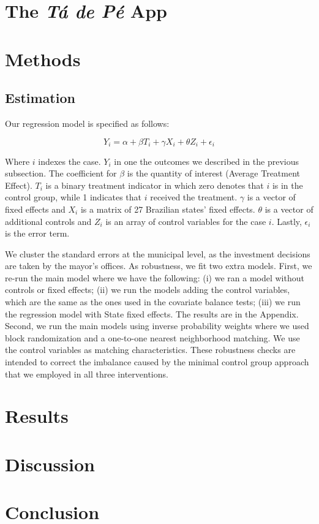 \documentclass[12pt,a4paper,]{article}
\begin{document}
\hypertarget{the-ta-de-pe-app}{%
\section{\texorpdfstring{The \emph{Tá de Pé}
App}{The Tá de Pé App}}\label{the-ta-de-pe-app}}

\hypertarget{methods}{%
\section{Methods}\label{methods}}

\hypertarget{estimation}{%
\subsection{Estimation}\label{estimation}}

Our regression model is specified as follows:

\[Y_{i} = \alpha + \beta T_{i} + \gamma X_{i} + \theta Z_i + \epsilon_{i} \]

Where \(i\) indexes the case. \(Y_i\) in one the outcomes we described
in the previous subsection. The coefficient for \(\beta\) is the
quantity of interest (Average Treatment Effect). \(T_i\) is a binary
treatment indicator in which zero denotes that \(i\) is in the control
group, while 1 indicates that \(i\) received the treatment. \(\gamma\)
is a vector of fixed effects and \(X_i\) is a matrix of 27 Brazilian
states' fixed effects. \(\theta\) is a vector of additional controls and
\(Z_i\) is an array of control variables for the case \(i\). Lastly,
\(\epsilon_i\) is the error term.

We cluster the standard errors at the municipal level, as the investment
decisions are taken by the mayor's offices. As robustness, we fit two
extra models. First, we re-run the main model where we have the
following: (i) we ran a model without controls or fixed effects; (ii) we
run the models adding the control variables, which are the same as the
ones used in the covariate balance tests; (iii) we run the regression
model with State fixed effects. The results are in the Appendix. Second,
we run the main models using inverse probability weights where we used
block randomization and a one-to-one nearest neighborhood matching. We
use the control variables as matching characteristics. These robustness
checks are intended to correct the imbalance caused by the minimal
control group approach that we employed in all three interventions.

\hypertarget{results}{%
\section{Results}\label{results}}

\hypertarget{discussion}{%
\section{Discussion}\label{discussion}}

\hypertarget{conclusion}{%
\section{Conclusion}\label{conclusion}}

\newpage
\setlength{\parindent}{0cm}
\setlength{\parskip}{5pt}


\end{document}

